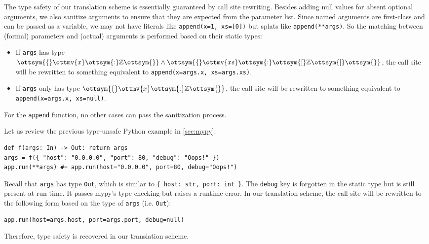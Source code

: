 The type safety of our translation scheme is essentially guaranteed by call site
rewriting. Besides adding null values for absent optional arguments, we also
sanitize arguments to ensure that they are expected from the parameter list.
Since named arguments are first-class and can be passed as a variable, we may
not have literals like \lstinline{append(x=1, xs=[0])} but splats like
\lstinline{append(**args)}. So the matching between (formal) parameters and
(actual) arguments is performed based on their static types:
\begin{itemize}
\item If \lstinline{args} has type $\ottsym{\{}  \ottmv{x}  \ottsym{:}   \mathbb{Z}   \ottsym{\}}  \land  \ottsym{\{}  \ottmv{xs}  \ottsym{:}  \ottsym{[}   \mathbb{Z}   \ottsym{]}  \ottsym{\}}$, the call site will be
      rewritten to something equivalent to \lstinline{append(x=args.x, xs=args.xs)}.
\item If \lstinline{args} only has type $\ottsym{\{}  \ottmv{x}  \ottsym{:}   \mathbb{Z}   \ottsym{\}}$, the call site will be
      rewritten to something equivalent to \lstinline{append(x=args.x, xs=null)}.
\end{itemize}
For the \lstinline{append} function, no other cases can pass the sanitization process.

Let us review the previous type-unsafe Python example in \autoref{sec:mypy}:
\begin{lstlisting}[language={[3]Python}]
def f(args: In) -> Out: return args
args = f({ "host": "0.0.0.0", "port": 80, "debug": "Oops!" })
app.run(**args) #= app.run(host="0.0.0.0", port=80, debug="Oops!")
\end{lstlisting}
Recall that \lstinline{args} has type \lstinline{Out}, which is similar to
\lstinline|{ host: str, port: int }|. The \lstinline{debug} key is forgotten in
the static type but is still present at run time. It passes mypy's type checking
but raises a runtime error. In our translation scheme, the call site will be
rewritten to the following form based on the type of \lstinline{args} (i.e.
\lstinline{Out}):
\begin{lstlisting}[language={[3]Python}]
app.run(host=args.host, port=args.port, debug=null)
\end{lstlisting}
Therefore, type safety is recovered in our translation scheme.

